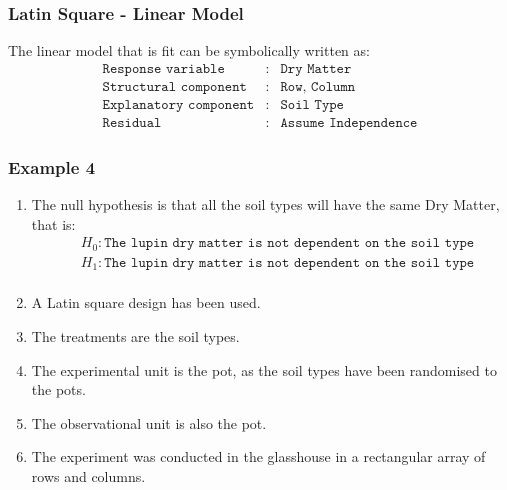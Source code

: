\begin{frame}\frametitle{Latin Square - Linear Model}
The linear model that is fit can be symbolically written as:
\begin{eqnarray*}
	\texttt{Response variable}&:& \texttt{Dry Matter} \\
	\texttt{Structural component}&:& \texttt{Row, Column}\\
	\texttt{Explanatory component}&:& \texttt{Soil Type}\\
	\texttt{Residual}&:& \texttt{Assume Independence}
\end{eqnarray*}
\end{frame}

\begin{frame}\frametitle{Example 4}
\begin{enumerate}
\item The null hypothesis is that all the soil types will have the same Dry Matter, that is:
\begin{align*}
& H_0: \texttt{The lupin dry matter is not dependent on the soil type}\\
& H_1:\texttt{The lupin dry matter is not dependent on the soil type}\\
\end{align*}
\item A Latin square design has been used. \\
\item The treatments are the soil types.\\
\item The experimental unit is the pot, as the soil types have been randomised to the pots.\\
\item The observational unit is also the pot.\\
\item The experiment was conducted in the glasshouse in a rectangular array of rows and columns.\\
\end{enumerate}
\end{frame}



